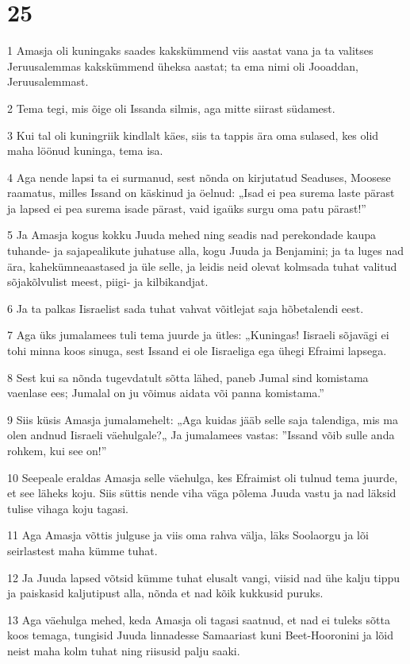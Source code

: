 \chapter{25}

\par 1 Amasja oli kuningaks saades kakskümmend viis aastat vana ja ta valitses Jeruusalemmas kakskümmend üheksa aastat; ta ema nimi oli Jooaddan, Jeruusalemmast.
\par 2 Tema tegi, mis õige oli Issanda silmis, aga mitte siirast südamest.
\par 3 Kui tal oli kuningriik kindlalt käes, siis ta tappis ära oma sulased, kes olid maha löönud kuninga, tema isa.
\par 4 Aga nende lapsi ta ei surmanud, sest nõnda on kirjutatud Seaduses, Moosese raamatus, milles Issand on käskinud ja öelnud: „Isad ei pea surema laste pärast ja lapsed ei pea surema isade pärast, vaid igaüks surgu oma patu pärast!”
\par 5 Ja Amasja kogus kokku Juuda mehed ning seadis nad perekondade kaupa tuhande- ja sajapealikute juhatuse alla, kogu Juuda ja Benjamini; ja ta luges nad ära, kahekümneaastased ja üle selle, ja leidis neid olevat kolmsada tuhat valitud sõjakõlvulist meest, piigi- ja kilbikandjat.
\par 6 Ja ta palkas Iisraelist sada tuhat vahvat võitlejat saja hõbetalendi eest.
\par 7 Aga üks jumalamees tuli tema juurde ja ütles: „Kuningas! Iisraeli sõjavägi ei tohi minna koos sinuga, sest Issand ei ole Iisraeliga ega ühegi Efraimi lapsega.
\par 8 Sest kui sa nõnda tugevdatult sõtta lähed, paneb Jumal sind komistama vaenlase ees; Jumalal on ju võimus aidata või panna komistama.”
\par 9 Siis küsis Amasja jumalamehelt: „Aga kuidas jääb selle saja talendiga, mis ma olen andnud Iisraeli väehulgale?„ Ja jumalamees vastas: ”Issand võib sulle anda rohkem, kui see on!”
\par 10 Seepeale eraldas Amasja selle väehulga, kes Efraimist oli tulnud tema juurde, et see läheks koju. Siis süttis nende viha väga põlema Juuda vastu ja nad läksid tulise vihaga koju tagasi.
\par 11 Aga Amasja võttis julguse ja viis oma rahva välja, läks Soolaorgu ja lõi seirlastest maha kümme tuhat.
\par 12 Ja Juuda lapsed võtsid kümme tuhat elusalt vangi, viisid nad ühe kalju tippu ja paiskasid kaljutipust alla, nõnda et nad kõik kukkusid puruks.
\par 13 Aga väehulga mehed, keda Amasja oli tagasi saatnud, et nad ei tuleks sõtta koos temaga, tungisid Juuda linnadesse Samaariast kuni Beet-Hooronini ja lõid neist maha kolm tuhat ning riisusid palju saaki.

